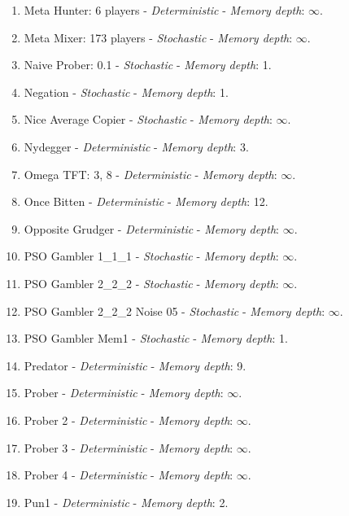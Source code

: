 \documentclass[10pt,letterpaper]{article}
\begin{document}
\begin{enumerate}
\item Meta Hunter: 6 players - \textit{Deterministic} - \textit{Memory depth}: \(\infty\). \cite{axelrodproject}
\item Meta Mixer: 173 players - \textit{Stochastic} - \textit{Memory depth}: \(\infty\). \cite{axelrodproject}
\item Naive Prober: 0.1 - \textit{Stochastic} - \textit{Memory depth}: 1. \cite{Li2011}
\item Negation - \textit{Stochastic} - \textit{Memory depth}: 1. \cite{PD2017}
\item Nice Average Copier - \textit{Stochastic} - \textit{Memory depth}: \(\infty\). \cite{axelrodproject}
\item Nydegger - \textit{Deterministic} - \textit{Memory depth}: 3. \cite{Axelrod1980}
\item Omega TFT: 3, 8 - \textit{Deterministic} - \textit{Memory depth}: \(\infty\). \cite{kendall2007iterated}
\item Once Bitten - \textit{Deterministic} - \textit{Memory depth}: 12. \cite{axelrodproject}
\item Opposite Grudger - \textit{Deterministic} - \textit{Memory depth}: \(\infty\). \cite{axelrodproject}
\item PSO Gambler 1\_1\_1 - \textit{Stochastic} - \textit{Memory depth}: \(\infty\). \cite{axelrodproject}
\item PSO Gambler 2\_2\_2 - \textit{Stochastic} - \textit{Memory depth}: \(\infty\). \cite{axelrodproject}
\item PSO Gambler 2\_2\_2 Noise 05 - \textit{Stochastic} - \textit{Memory depth}: \(\infty\). \cite{axelrodproject}
\item PSO Gambler Mem1 - \textit{Stochastic} - \textit{Memory depth}: 1. \cite{axelrodproject}
\item Predator - \textit{Deterministic} - \textit{Memory depth}: 9. \cite{Ashlock2006}
\item Prober - \textit{Deterministic} - \textit{Memory depth}: \(\infty\). \cite{Li2011}
\item Prober 2 - \textit{Deterministic} - \textit{Memory depth}: \(\infty\). \cite{Prison1998}
\item Prober 3 - \textit{Deterministic} - \textit{Memory depth}: \(\infty\). \cite{Prison1998}
\item Prober 4 - \textit{Deterministic} - \textit{Memory depth}: \(\infty\). \cite{Prison1998}
\item Pun1 - \textit{Deterministic} - \textit{Memory depth}: 2. \cite{Ashlock2006}

\end{enumerate}
\end{document}
